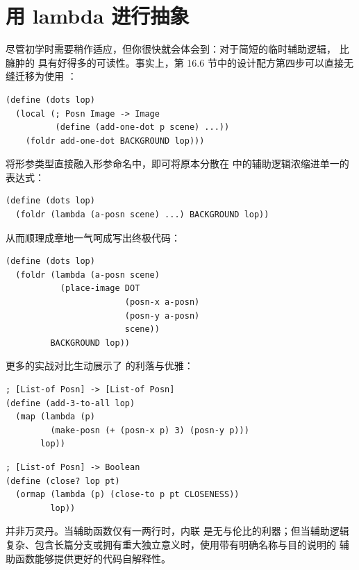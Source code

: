 \section{用 lambda 进行抽象}
\label{sec:17_3}

尽管初学时需要稍作适应，但你很快就会体会到：对于简短的临时辅助逻辑， 比臃肿的  具有好得多的可读性。事实上，第 16.6 节中的设计配方第四步可以直接无缝迁移为使用 ：

\begin{lstlisting}[language=BSL]
(define (dots lop)
  (local (; Posn Image -> Image
          (define (add-one-dot p scene) ...))
    (foldr add-one-dot BACKGROUND lop)))
\end{lstlisting}

将形参类型直接融入形参命名中，即可将原本分散在  中的辅助逻辑浓缩进单一的  表达式：

\begin{lstlisting}[language=BSL]
(define (dots lop)
  (foldr (lambda (a-posn scene) ...) BACKGROUND lop))
\end{lstlisting}

从而顺理成章地一气呵成写出终极代码：

\begin{lstlisting}[language=BSL]
(define (dots lop)
  (foldr (lambda (a-posn scene)
           (place-image DOT
                        (posn-x a-posn)
                        (posn-y a-posn)
                        scene))
         BACKGROUND lop))
\end{lstlisting}

更多的实战对比生动展示了  的利落与优雅：

\begin{lstlisting}[language=BSL]
; [List-of Posn] -> [List-of Posn]
(define (add-3-to-all lop)
  (map (lambda (p)
         (make-posn (+ (posn-x p) 3) (posn-y p)))
       lop))
\end{lstlisting}

\begin{lstlisting}[language=BSL]
; [List-of Posn] -> Boolean
(define (close? lop pt)
  (ormap (lambda (p) (close-to p pt CLOSENESS))
         lop))
\end{lstlisting}

\begin{notebox}
 并非万灵丹。当辅助函数仅有一两行时，内联  是无与伦比的利器；但当辅助逻辑复杂、包含长篇分支或拥有重大独立意义时，使用带有明确名称与目的说明的  辅助函数能够提供更好的代码自解释性。
\end{notebox}

